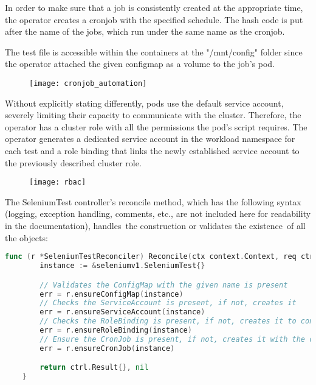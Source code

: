 In order to make sure that a job is consistently created at the appropriate time, the operator creates a cronjob with the specified schedule. The hash code is put after the name of the jobs, which run under the same name as the cronjob.

The test file is accessible within the containers at the "/mnt/config" folder since the operator attached the given configmap as a volume to the job's pod.

\begin{figure}[H]
	\centering
	\texttt{[image: cronjob\_automation]}
	\label{fig:cronjob_automation}
\end{figure}

Without explicitly stating differently, pods use the default service account, severely limiting their capacity to communicate with the cluster. Therefore, the operator has a cluster role with all the permissions the pod's script requires. The operator generates a dedicated service account in the workload namespace for each test and a role binding that links the newly established service account to the previously described cluster role.

\begin{figure}[H]
	\centering
	\texttt{[image: rbac]}
	\label{fig:rbac}
\end{figure}

The SeleniumTest controller's reconcile method, which has the following syntax (logging, exception handling, comments, etc., are not included here for readability in the documentation), handles the construction or validates the existence of all the objects:

\begin{lstlisting}[language={Go}]
	func (r *SeleniumTestReconciler) Reconcile(ctx context.Context, req ctrl.Request) (ctrl.Result, error) {
		instance := &seleniumv1.SeleniumTest{}

		// Validates the ConfigMap with the given name is present
		err = r.ensureConfigMap(instance)
		// Checks the ServiceAccount is present, if not, creates it
		err = r.ensureServiceAccount(instance)
		// Checks the RoleBinding is present, if not, creates it to connect the service account to the cluster role
		err = r.ensureRoleBinding(instance)
		// Ensure the CronJob is present, if not, creates it with the configmap attached as volume, with the serviceaccount above 
		err = r.ensureCronJob(instance)

		return ctrl.Result{}, nil
	}	
\end{lstlisting}

